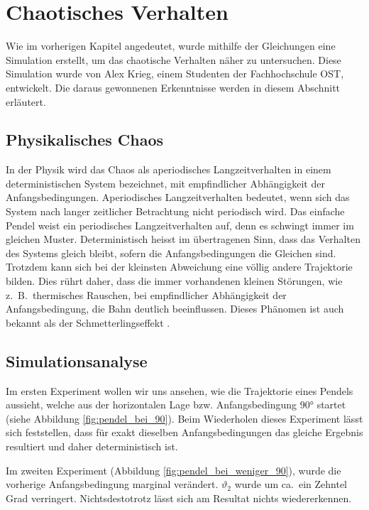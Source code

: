 \section{Chaotisches Verhalten}
Wie im vorherigen Kapitel angedeutet, wurde mithilfe der Gleichungen eine Simulation erstellt,
um das chaotische Verhalten näher zu untersuchen.
Diese Simulation wurde von Alex Krieg, einem Studenten der Fachhochschule OST, entwickelt.
%
%
Die daraus gewonnenen Erkenntnisse werden in diesem Abschnitt erläutert.


\subsection{Physikalisches Chaos}
In der Physik wird das Chaos als aperiodisches Langzeitverhalten in einem deterministischen
%
%
System bezeichnet, mit empfindlicher Abhängigkeit der Anfangsbedingungen.
%
%
Aperiodisches Langzeitverhalten bedeutet, wenn sich das System nach langer zeitlicher Betrachtung
nicht periodisch wird.
Das einfache Pendel weist ein periodisches Langzeitverhalten auf,
denn es schwingt immer im gleichen Muster.
Deterministisch heisst im übertragenen Sinn, dass das Verhalten des Systems gleich bleibt,
sofern die Anfangsbedingungen die Gleichen sind.
Trotzdem kann sich bei der kleinsten Abweichung eine völlig andere Trajektorie bilden.
Dies rührt daher, dass die immer vorhandenen kleinen Störungen, wie z.~B.~thermisches Rauschen,
%
%
bei empfindlicher Abhängigkeit der Anfangsbedingung, die Bahn deutlich beeinflussen.
Dieses Phänomen ist auch bekannt als der Schmetterlingseffekt \cite{doppelpendel:schmetterlingseffekt}.
%

\subsection{Simulationsanalyse}
Im ersten Experiment wollen wir uns ansehen, wie die Trajektorie eines Pendels aussieht,
welche aus der horizontalen Lage bzw. Anfangsbedingung 90° startet
(siehe Abbildung \ref{fig:pendel_bei_90}).
Beim Wiederholen dieses Experiment lässt sich feststellen, dass für exakt dieselben Anfangsbedingungen
das gleiche Ergebnis resultiert und daher deterministisch ist.

Im zweiten Experiment (Abbildung \ref{fig:pendel_bei_weniger_90}), wurde die vorherige
Anfangsbedingung marginal verändert.
\(\vartheta_2\) wurde um ca.~ein Zehntel Grad verringert.
Nichtsdestotrotz lässt sich am Resultat nichts wiedererkennen.

